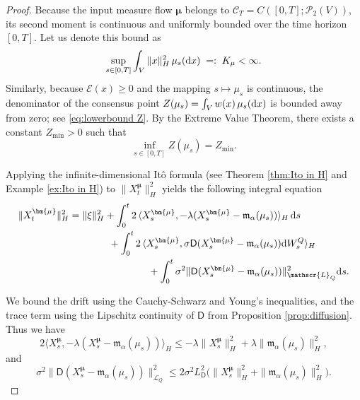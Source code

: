 \documentclass[12pt]{amsart}
\newcommand{\D}[1]{\mbox{\rm #1}}
\newcommand{\dd}{\D{d}}
\numberwithin{equation}{section}
\begin{document}
\begin{proof}
Because the input measure flow $\bm{\mu}$ belongs to $\mathscr{C}_T = C([0,T]; \mathscr{P}_2(V))$, its second moment is continuous and uniformly bounded over the time horizon $[0,T]$. Let us denote this bound as 
\begin{equation}\label{K_mu}
    \sup_{s \in [0,T]} \int_V \|x\|_H^2\, \mu_s(\dd x) \; =:\; K_\mu < \infty.
\end{equation}
Similarly, because $\mathscr{E}(x) \geq 0$ and the mapping $s \mapsto \mu_s$ is continuous, the denominator of the consensus point $Z(\mu_s) = \int_{V} w(x)\,\mu_{s}(\dd x)$ is bounded away from zero; see \eqref{eq:lowerbound Z}. By the Extreme Value Theorem, there exists a constant $Z_{\min} > 0$ such that
\begin{equation}\label{z_min}
    \inf_{s \in [0,T]} Z(\mu_s) = Z_{\min}.
\end{equation}



Applying the infinite-dimensional It\^o formula (see Theorem \ref{thm:Ito in H} and Example \ref{ex:Ito in H}) to $\|X^{\bm{\mu}}_t\|_H^2$ yields the following integral equation 
\begin{equation}
\label{eq:ito_norm_squared}
\begin{aligned}
    \|X^{\bm{\mu}}_t\|_H^2 &= \|\xi\|_H^2 + \int_0^t 2\, \langle X^{\bm{\mu}}_s, -\lambda(X^{\bm{\mu}}_s - \mathfrak{m}_\alpha(\mu_s)) \rangle_H \,\dd s \\
    &\qquad \qquad + \int_0^t 2 \, \langle X^{\bm{\mu}}_s, \sigma \mathsf{D}(X^{\bm{\mu}}_s - \mathfrak{m}_\alpha(\mu_s)) \dd W_s^{Q} \rangle_H\\
    &\qquad \qquad \qquad \qquad + \int_0^t \sigma^2 \|\mathsf{D}(X^{\bm{\mu}}_s - \mathfrak{m}_\alpha(\mu_s))\|_{\mathscr{L}_Q}^2 \dd s.
\end{aligned}
\end{equation}

We bound the drift using the Cauchy-Schwarz and Young's inequalities, and the trace term using the Lipschitz continuity of $\mathsf{D}$ from Proposition \ref{prop:diffusion}. Thus we have
\[
    2 \langle X^{\bm{\mu}}_s, -\lambda(X^{\bm{\mu}}_s - \mathfrak{m}_\alpha(\mu_s)) \rangle_H \leq -\lambda \|X^{\bm{\mu}}_s\|_H^2 + \lambda \|\mathfrak{m}_\alpha(\mu_s)\|_H^2, 
\]
and
\[
    \sigma^2 \|\mathsf{D}(X^{\bm{\mu}}_s - \mathfrak{m}_\alpha(\mu_s))\|_{\mathscr{L}_Q}^2 \leq 2\sigma^2 L_{\mathsf{D}}^2 \big(\|X^{\bm{\mu}}_s\|_H^2 + \|\mathfrak{m}_\alpha(\mu_s)\|_H^2\big).
\]


\end{proof}
\end{document}
